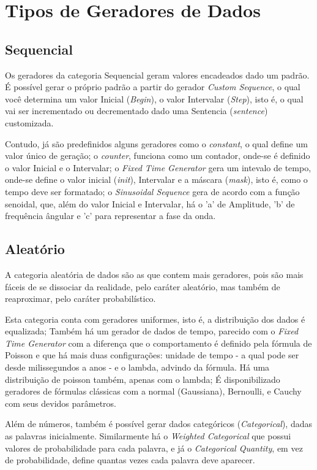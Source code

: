 \documentclass[
	12pt,				%
	openright,			%
	twoside,			%
	a4paper,			%
	english,			%
	brazil				%
	]{abntex2}
\begin{document}
	\section{Tipos de Geradores de Dados}
		\subsection{Sequencial}
		Os geradores da categoria Sequencial geram valores encadeados dado um padrão.
		É possível gerar o próprio padrão a partir do gerador \emph{Custom Sequence}, o qual você determina um valor Inicial (\emph{Begin}), o valor Intervalar (\emph{Step}), isto é, o qual vai ser incrementado ou decrementado dado uma Sentencia (\emph{sentence}) customizada.
		\par
		Contudo, já são predefinidos alguns geradores como 
			o \emph{constant}, o qual define um valor único de geração;
			o \emph{counter}, funciona como um contador, onde-se é definido o valor Inicial e o Intervalar;
			o \emph{Fixed Time Generator} gera um intevalo de tempo, onde-se define o valor inicial (\emph{init}), Intervalar e a máscara (\emph{mask}), isto é, como o tempo deve ser formatado;
			o \emph{Sinusoidal Sequence} gera de acordo com a função senoidal, que, além do valor Inicial e Intervalar, há o 'a' de Amplitude, 'b' de frequência ângular e 'c' para representar a fase da onda.

		\subsection{Aleatório}
		A categoria aleatória de dados são as que contem mais geradores, pois são mais fáceis de se dissociar da realidade, pelo caráter aleatório, mas também de reaproximar, pelo caráter probabilístico.
		\par
		Esta categoria conta com geradores uniformes, isto é, a distribuição dos dados é equalizada;
			Também há um gerador de dados de tempo, parecido com o \emph{Fixed Time Generator} com a diferença que o comportamento é definido pela fórmula de Poisson e que há mais duas configurações: unidade de tempo - a qual pode ser desde milissegundos a anos - e o lambda, advindo da fórmula.
			Há uma distribuição de poisson também, apenas com o lambda;
			É disponibilizado geradores de fórmulas clássicas com a normal (Gaussiana), Bernoulli, e Cauchy com seus devidos parâmetros.
		\par
		Além de números, também é possível gerar dados categóricos (\emph{Categorical}), dadas as palavras inicialmente.
			Similarmente há o \emph{Weighted Categorical} que possui valores de probabilidade para cada palavra, e 
			já o \emph{Categorical Quantity}, em vez de probabilidade, define quantas vezes cada palavra deve aparecer.
\end{document}
